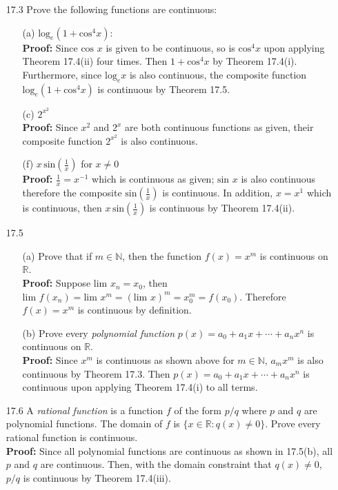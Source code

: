 \documentclass{article}
\begin{document}
\begin{itemize}
    \item [17.3] Prove the following functions are continuous:
          \begin{itemize}
              \item [(a)] $\text{log}_e(1+\text{cos}^4x)$:\\\textbf{Proof: } Since $\text{cos }x$ is given to be continuous, so is $\text{cos}^4x$ upon applying Theorem 17.4(ii) four times. Then $1+\text{cos}^4x$ by Theorem 17.4(i). Furthermore, since $\text{log}_ex$ is also continuous, the composite function $\text{log}_e(1+\text{cos}^4x)$ is continuous by Theorem 17.5.
              \item [(c)] $2^{x^2}$\\\textbf{Proof: } Since $x^2$ and $2^x$ are both continuous functions as given, their composite function $2^{x^2}$ is also continuous.
              \item [(f)] $x\,\text{sin}(\frac{1}{x})$ for $x\neq 0$\\\textbf{Proof: } $\frac{1}{x}=x^{-1}$ which is continuous as given; $\text{sin }x$ is also continuous therefore the composite $\text{sin}(\frac{1}{x})$ is continuous. In addition, $x=x^1$ which is continuous, then $x\,\text{sin}(\frac{1}{x})$ is continuous by Theorem 17.4(ii).
          \end{itemize}
    \item [17.5]
          \begin{itemize}
              \item [(a)] Prove that if $m\in\mathbb{N}$, then the function $f(x)=x^m$ is continuous on $\mathbb{R}$.\\\textbf{Proof: } Suppose $\text{lim }x_n=x_0$, then $\text{lim }f(x_n)=\text{lim }x^m=(\text{lim }x)^m=x_0^m=f(x_0)$. Therefore $f(x)=x^m$ is continuous by definition.
              \item [(b)] Prove every \textit{polynomial function} $p(x)=a_0+a_1x+\cdots+a_nx^n$ is continuous on $\mathbb{R}$.\\\textbf{Proof: } Since $x^m$ is continuous as shown above for $m\in\mathbb{N}$, $a_mx^m$ is also continuous by Theorem 17.3. Then $p(x)=a_0+a_1x+\cdots+a_nx^n$ is continuous upon applying Theorem 17.4(i) to all terms.
          \end{itemize}
    \item [17.6] A \textit{rational function} is a function $f$ of the form $p/q$ where $p$ and $q$ are polynomial functions. The domain of $f$ is $\{x\in\mathbb{R}:q(x)\neq 0\}$. Prove every rational function is continuous.\\\textbf{Proof: } Since all polynomial functions are continuous as shown in 17.5(b), all $p$ and $q$ are continuous. Then, with the domain constraint that $q(x)\neq 0$, $p/q$ is continuous by Theorem 17.4(iii).

\end{itemize}
\end{document}
